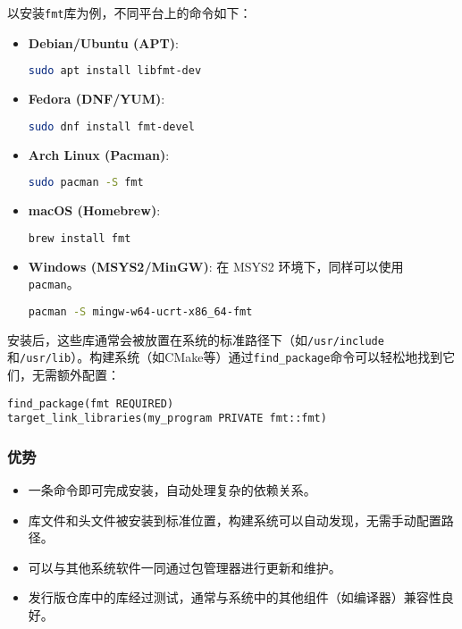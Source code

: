 \documentclass[../main]{subfiles}
\begin{document}
以安装\texttt{fmt}库为例，不同平台上的命令如下：

\begin{itemize}
    \item \textbf{Debian/Ubuntu (APT)}:
    \begin{lstlisting}[language=bash]
sudo apt install libfmt-dev
    \end{lstlisting}
    \item \textbf{Fedora (DNF/YUM)}:
    \begin{lstlisting}[language=bash]
sudo dnf install fmt-devel
    \end{lstlisting}
    \item \textbf{Arch Linux (Pacman)}:
    \begin{lstlisting}[language=bash]
sudo pacman -S fmt
    \end{lstlisting}
    \item \textbf{macOS (Homebrew)}:
    \begin{lstlisting}[language=bash]
brew install fmt
    \end{lstlisting}
    \item \textbf{Windows (MSYS2/MinGW)}: 在 MSYS2 环境下，同样可以使用 \texttt{pacman}。
    \begin{lstlisting}[language=bash]
pacman -S mingw-w64-ucrt-x86_64-fmt
    \end{lstlisting}
\end{itemize}

安装后，这些库通常会被放置在系统的标准路径下（如\texttt{/usr/include}和\texttt{/usr/lib}）。构建系统（如CMake等）通过\texttt{find\_package}命令可以轻松地找到它们，无需额外配置：
\begin{lstlisting}
find_package(fmt REQUIRED)
target_link_libraries(my_program PRIVATE fmt::fmt)
\end{lstlisting}

\subsubsection{优势}
\begin{itemize}
    \item 一条命令即可完成安装，自动处理复杂的依赖关系。
    \item 库文件和头文件被安装到标准位置，构建系统可以自动发现，无需手动配置路径。
    \item 可以与其他系统软件一同通过包管理器进行更新和维护。
    \item 发行版仓库中的库经过测试，通常与系统中的其他组件（如编译器）兼容性良好。
\end{itemize}
\end{document}
